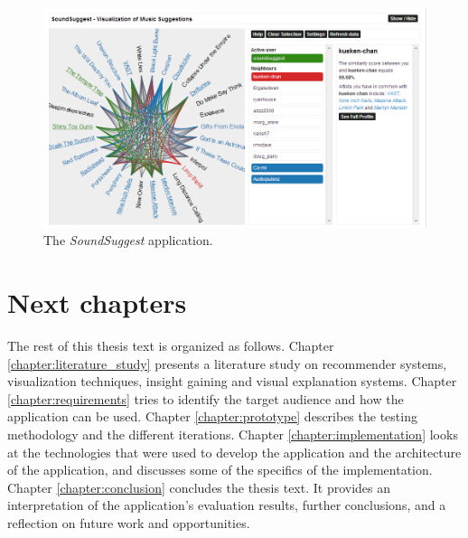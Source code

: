 \begin{figure}
	\begin{center}
		\includegraphics[width=\columnwidth]{img/soundsuggest}%
	\end{center}
	\caption{The \emph{SoundSuggest} application.}
	\label{figure:soundsuggest}
\end{figure}


\section{Next chapters}\label{chapter:introduction:section:chapters}

The rest of this thesis text is organized as follows. Chapter \ref{chapter:literature_study} presents a literature study on recommender systems, visualization techniques, insight gaining and visual explanation systems. Chapter \ref{chapter:requirements} tries to identify the target audience and how the application can be used. Chapter \ref{chapter:prototype} describes the testing methodology and the different iterations. Chapter \ref{chapter:implementation} looks at the technologies that were used to develop the application and the architecture of the application, and discusses some of the specifics of the implementation. Chapter \ref{chapter:conclusion} concludes the thesis text. It provides an interpretation of the application's evaluation results, further conclusions, and a reflection on future work and opportunities.
